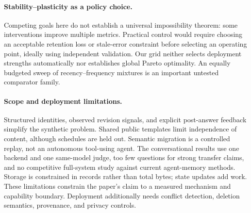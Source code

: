 \paragraph{Stability--plasticity as a policy choice.}
Competing goals here do not establish a universal impossibility theorem: some interventions improve multiple metrics. Practical control would require choosing an acceptable retention loss or stale-error constraint before selecting an operating point, ideally using independent validation. Our grid neither selects deployment strengths automatically nor establishes global Pareto optimality. An equally budgeted sweep of recency--frequency mixtures is an important untested comparator family.

\paragraph{Scope and deployment limitations.}
Structured identities, observed revision signals, and explicit post-answer feedback simplify the synthetic problem. Shared public templates limit independence of content, although schedules are held out. Semantic migration is a controlled replay, not an autonomous tool-using agent. The conversational results use one backend and one same-model judge, too few questions for strong transfer claims, and no competitive full-system study against current agent-memory methods. Storage is constrained in records rather than total bytes; state updates add work. These limitations constrain the paper's claim to a measured mechanism and capability boundary. Deployment additionally needs conflict detection, deletion semantics, provenance, and privacy controls.
